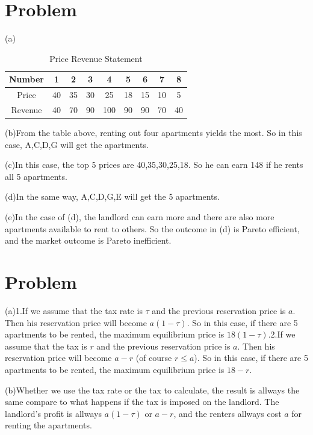 \documentclass[a4 paper,12pt]{article}
\begin{document}
\section{Problem}
(a)\begin{table}[H]
	\centering
	\caption*{Price Revenue Statement}
	\begin{tabular}{c|*{8}{c}}
		\toprule[0.5mm]
		Number&1&2&3&4&5&6&7&8\\
		\midrule
		Price&40&35&30&25&18&15&10&5\\
		Revenue&40&70&90&100&90&90&70&40\\
		\bottomrule[0.5mm]
	\end{tabular}
\end{table}
\par (b)From the table above, renting out four apartments yields the most. So in this case, A,C,D,G will get the apartments.
\par (c)In this case, the top 5 prices are 40,35,30,25,18. So he can earn 148 if he rents all 5 apartments.
\par (d)In the same way, A,C,D,G,E will get the 5 apartments.
\par (e)In the case of (d), the landlord can earn more and there are also more apartments available to rent to others. So the outcome in (d) is Pareto efficient, and the market outcome is Pareto inefficient.
\section{Problem}
(a)1.If we assume that the tax rate is $\tau$ and the previous reservation price is $a$. Then his reservation price will become $a(1-\tau)$. So in this case, if there are 5 apartments to be rented,  the maximum equilibrium price is $18(1-\tau)$.\quad2.If we assume that the tax is $r$ and the previous reservation price is $a$. Then his reservation price will become $a-r$ (of course $r\leq a$). So in this case, if there are 5 apartments to be rented,  the maximum equilibrium price is $18-r$.
\par (b)Whether we use the tax rate or the tax to calculate, the result is allways the same compare to what happens if the tax is imposed on the landlord. The landlord's
profit is allways $a(1-\tau)$ or $a-r$, and the renters allways cost $a$ for renting the apartments.
\end{document}
